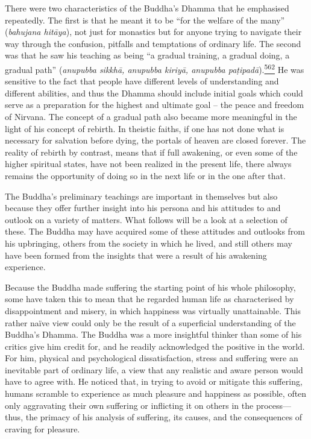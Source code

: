 There were two characteristics of the Buddha's Dhamma that he emphasised
repeatedly. The first is that he meant it to be ``for the welfare of the
many'' (\emph{bahujana hitāya}), not just for monastics but for anyone
trying to navigate their way through the confusion, pitfalls and
temptations of ordinary life. The second was that he saw his teaching as
being ``a gradual training, a gradual doing, a gradual path''
(\emph{anupubba sikkhā, anupubba kiriyā, anupubba
paṭipadā}).\label{footprints_split_015.html_fnref562}\hyperref[footprints_split_025.htmlux5cux23fn562]{\textsuperscript{562}}
He was sensitive to the fact that people have different levels of
understanding and different abilities, and thus the Dhamma should
include initial goals which could serve as a preparation for the highest
and ultimate goal -- the peace and freedom of Nirvana. The concept of a
gradual path also became more meaningful in the light of his concept of
rebirth. In theistic faiths, if one has not done what is necessary for
salvation before dying, the portals of heaven are closed forever. The
reality of rebirth by contrast, means that if full awakening, or even
some of the higher spiritual states, have not been realized in the
present life, there always remains the opportunity of doing so in the
next life or in the one after that.

The Buddha's preliminary teachings are important in themselves but also
because they offer further insight into his persona and his attitudes to
and outlook on a variety of matters. What follows will be a look at a
selection of these. The Buddha may have acquired some of these attitudes
and outlooks from his upbringing, others from the society in which he
lived, and still others may have been formed from the insights that were
a result of his awakening experience.

Because the Buddha made suffering the starting point of his whole
philosophy, some have taken this to mean that he regarded human life as
characterised by disappointment and misery, in which happiness was
virtually unattainable. This rather naïve view could only be the result
of a superficial understanding of the Buddha's Dhamma. The Buddha was a
more insightful thinker than some of his critics give him credit for,
and he readily acknowledged the positive in the world. For him, physical
and psychological dissatisfaction, stress and suffering were an
inevitable part of ordinary life, a view that any realistic and aware
person would have to agree with. He noticed that, in trying to avoid or
mitigate this suffering, humans scramble to experience as much pleasure
and happiness as possible, often only aggravating their own suffering or
inflicting it on others in the process---thus, the primacy of his
analysis of suffering, its causes, and the consequences of craving for
pleasure.

